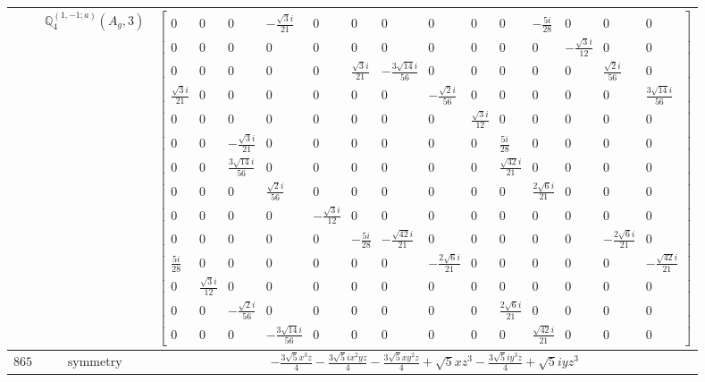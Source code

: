 \documentclass[fleqn,8pt,landscape]{jsarticle}
\begin{document}
\begin{longtable}{ccc}
$  $ & $ \mathbb{Q}_{4}^{(1,-1;a)}(A_{g},3) $ & $ \begin{bmatrix} 0 & 0 & 0 & - \frac{\sqrt{3} i}{21} & 0 & 0 & 0 & 0 & 0 & 0 & - \frac{5 i}{28} & 0 & 0 & 0 \\ 0 & 0 & 0 & 0 & 0 & 0 & 0 & 0 & 0 & 0 & 0 & - \frac{\sqrt{3} i}{12} & 0 & 0 \\ 0 & 0 & 0 & 0 & 0 & \frac{\sqrt{3} i}{21} & - \frac{3 \sqrt{14} i}{56} & 0 & 0 & 0 & 0 & 0 & \frac{\sqrt{2} i}{56} & 0 \\ \frac{\sqrt{3} i}{21} & 0 & 0 & 0 & 0 & 0 & 0 & - \frac{\sqrt{2} i}{56} & 0 & 0 & 0 & 0 & 0 & \frac{3 \sqrt{14} i}{56} \\ 0 & 0 & 0 & 0 & 0 & 0 & 0 & 0 & \frac{\sqrt{3} i}{12} & 0 & 0 & 0 & 0 & 0 \\ 0 & 0 & - \frac{\sqrt{3} i}{21} & 0 & 0 & 0 & 0 & 0 & 0 & \frac{5 i}{28} & 0 & 0 & 0 & 0 \\ 0 & 0 & \frac{3 \sqrt{14} i}{56} & 0 & 0 & 0 & 0 & 0 & 0 & \frac{\sqrt{42} i}{21} & 0 & 0 & 0 & 0 \\ 0 & 0 & 0 & \frac{\sqrt{2} i}{56} & 0 & 0 & 0 & 0 & 0 & 0 & \frac{2 \sqrt{6} i}{21} & 0 & 0 & 0 \\ 0 & 0 & 0 & 0 & - \frac{\sqrt{3} i}{12} & 0 & 0 & 0 & 0 & 0 & 0 & 0 & 0 & 0 \\ 0 & 0 & 0 & 0 & 0 & - \frac{5 i}{28} & - \frac{\sqrt{42} i}{21} & 0 & 0 & 0 & 0 & 0 & - \frac{2 \sqrt{6} i}{21} & 0 \\ \frac{5 i}{28} & 0 & 0 & 0 & 0 & 0 & 0 & - \frac{2 \sqrt{6} i}{21} & 0 & 0 & 0 & 0 & 0 & - \frac{\sqrt{42} i}{21} \\ 0 & \frac{\sqrt{3} i}{12} & 0 & 0 & 0 & 0 & 0 & 0 & 0 & 0 & 0 & 0 & 0 & 0 \\ 0 & 0 & - \frac{\sqrt{2} i}{56} & 0 & 0 & 0 & 0 & 0 & 0 & \frac{2 \sqrt{6} i}{21} & 0 & 0 & 0 & 0 \\ 0 & 0 & 0 & - \frac{3 \sqrt{14} i}{56} & 0 & 0 & 0 & 0 & 0 & 0 & \frac{\sqrt{42} i}{21} & 0 & 0 & 0 \end{bmatrix} $ \\ \hline
$ 865 $ & $ \text{symmetry} $ & $ - \frac{3 \sqrt{5} x^{3} z}{4} - \frac{3 \sqrt{5} i x^{2} y z}{4} - \frac{3 \sqrt{5} x y^{2} z}{4} + \sqrt{5} x z^{3} - \frac{3 \sqrt{5} i y^{3} z}{4} + \sqrt{5} i y z^{3} $ \\

\end{longtable}
\end{document}
